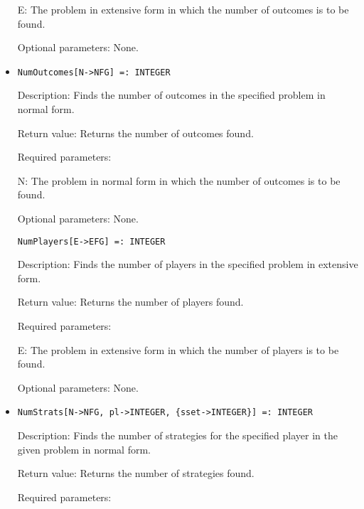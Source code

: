 \begin{itemize}
\bd
\item
[E:] The problem in extensive form in which the number of outcomes
is to be found.
\ed

\item
[Optional parameters:] None.
\ed

\item
\protect \large \begin{verbatim}
NumOutcomes[N->NFG] =: INTEGER
\end{verbatim}\normalsize

\bd
\item
[Description:] Finds the number of outcomes in the specified problem in
normal form.
\item
[Return value:] Returns the number of outcomes found.
\item
[Required parameters:]\hfil\null
	
\bd
\item
[ N:] The problem in normal form in which the number of outcomes is
to be found.
\ed

\item
[Optional parameters:] None.
\ed

\protect \large \begin{verbatim}
NumPlayers[E->EFG] =: INTEGER
\end{verbatim}
\normalsize

\bd
\item
[Description:] Finds the number of players in the specified problem in
extensive form.
\item
[Return value:] Returns the number of players found.
\item
[Required parameters:]\hfil\null

\bd
\item
[E:] The problem in extensive form in which the number of players
is to be found.
\ed

\item   
[Optional parameters:] None.
\ed

\item
\protect \large \begin{verbatim}
NumStrats[N->NFG, pl->INTEGER, {sset->INTEGER}] =: INTEGER
\end{verbatim}\normalsize

\bd

\item
[Description:] Finds the number of strategies for the specified player 
in the given problem in normal form.
\item
[Return value:] Returns the number of strategies found.
\item
[Required parameters:]\hfil\null


\end{itemize}
